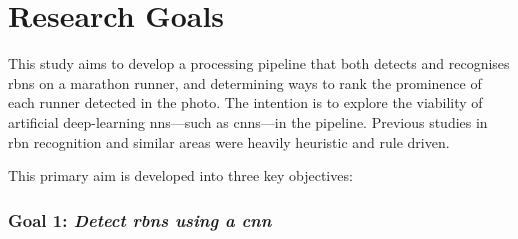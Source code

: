\section{Research Goals}
\label{sec:introduction:research_goals}

This study aims to develop a processing pipeline that both detects and recognises \glspl{rbn} on a marathon runner, and determining ways to rank the prominence of each runner detected in the photo. The intention is to explore the viability of artificial deep-learning \glspl{nn}---such as \glspl{cnn}---in the pipeline. Previous studies in \gls{rbn} recognition \citep{Benami:2012jf} and similar areas \citep{Kundu:2015vq, Eichner:2008dw, Torresen:2004jl} were heavily heuristic and rule driven.

This primary aim is developed into three key objectives:




\subsubsection*{Goal 1: \itshape Detect \glspl{rbn} using a \gls{cnn}}

